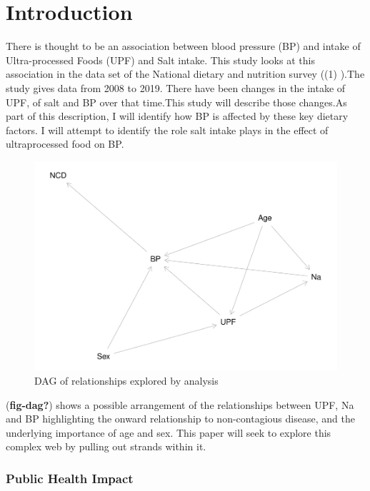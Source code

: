 \documentclass[
]{article}
\begin{document}
\newpage

\hypertarget{introduction}{%
\section{Introduction}\label{introduction}}

There is thought to be an association between blood pressure (BP) and
intake of Ultra-processed Foods (UPF) and Salt intake. This study looks
at this association in the data set of the National dietary and
nutrition survey ((1) ).The study gives data from 2008 to 2019. There
have been changes in the intake of UPF, of salt and BP over that
time.This study will describe those changes.As part of this description,
I will identify how BP is affected by these key dietary factors. I will
attempt to identify the role salt intake plays in the effect of
ultraprocessed food on BP.

\begin{figure}
\centering
\includegraphics{methodandresults_files/figure-latex/fig-dag-1.pdf}
\caption{DAG of relationships explored by analysis}
\end{figure}

(\textbf{fig-dag?}) shows a possible arrangement of the relationships
between UPF, Na and BP highlighting the onward relationship to
non-contagious disease, and the underlying importance of age and sex.
This paper will seek to explore this complex web by pulling out strands
within it.

\hypertarget{public-health-impact}{%
\subsubsection{Public Health Impact}\label{public-health-impact}}
\end{document}
